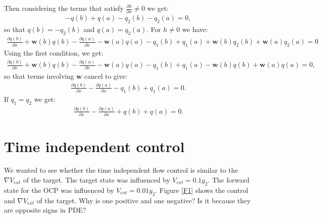 \documentclass[11pt, a4paper]{article}
\theoremstyle{definition}
\newcommand{\w}{\mathbf{w}}
\begin{document}
	Then considering the terms that satisfy $\frac{\partial h}{\partial x} \neq 0$ we get:
	\begin{align*}
		- q(b) + q(a) -q_2(b) - q_2(a) =0,
	\end{align*}
	so that $q(b) = -q_2(b)$ and $q(a) = q_2(a)$.
 	For $h \neq 0$ we have:
	\begin{align*}
		\frac{\partial q(b)}{\partial x} + \w(b) q(b) - \frac{\partial q(a)}{\partial x} - \w(a) q(a) - q_1(b) + q_1(a) + \w(b) q_2(b) + \w(a) q_2(a) = 0 
	\end{align*}
	Using the first condition, we get:
	\begin{align*}
		\frac{\partial q(b)}{\partial x} + \w(b) q(b) - \frac{\partial q(a)}{\partial x} - \w(a) q(a) - q_1(b) + q_1(a) - \w(b) q(b) + \w(a) q(a) = 0,
	\end{align*}
	so that terms involving $\w$ cancel to give:
	\begin{align*}
		\frac{\partial q(b)}{\partial x} - \frac{\partial q(a)}{\partial x} - q_1(b) + q_1(a) = 0.
	\end{align*}
	If $q_1 = q_2$ we get:
	\begin{align*}
		\frac{\partial q(b)}{\partial x} - \frac{\partial q(a)}{\partial x} + q(b) + q(a) = 0.
	\end{align*}

\section{Time independent control}
We wanted to see whether the time independent flow control is similar to the $\nabla V_{ext}$ of the target.
The target state was influenced by $V_{ext} = 0.1 y_2$. The forward state for the OCP was influenced by $V_{ext} = 0.01 y_2$. 
Figure \ref{F1} shows the control and $\nabla V_{ext}$ of the target. Why is one positive and one negative? Is it because they are opposite signs in PDE?
\end{document}
